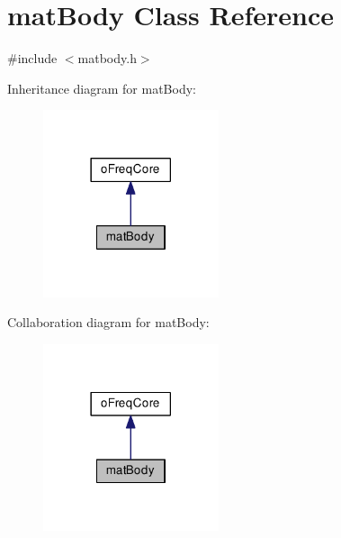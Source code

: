 \hypertarget{classmat_body}{\section{mat\-Body Class Reference}
\label{classmat_body}
}


{\ttfamily \#include $<$matbody.\-h$>$}



Inheritance diagram for mat\-Body\-:\nopagebreak
\begin{figure}[H]
\begin{center}
\leavevmode
\includegraphics[width=146pt]{classmat_body__inherit__graph}
\end{center}
\end{figure}


Collaboration diagram for mat\-Body\-:\nopagebreak
\begin{figure}[H]
\begin{center}
\leavevmode
\includegraphics[width=146pt]{classmat_body__coll__graph}
\end{center}
\end{figure}
